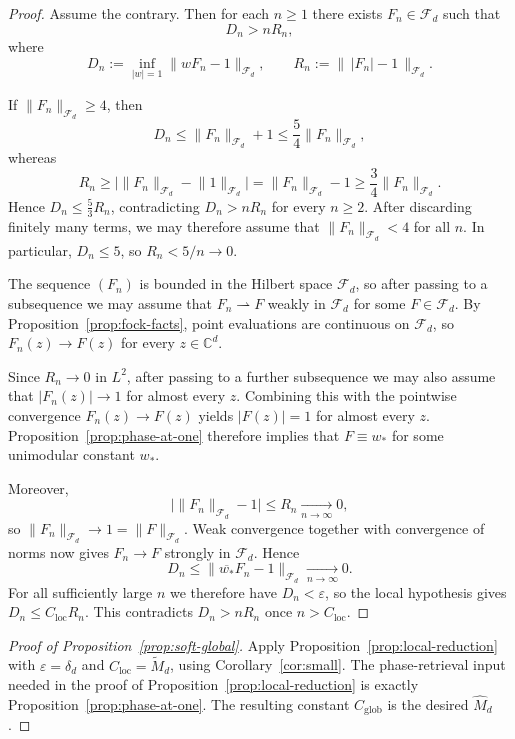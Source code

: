\documentclass[11pt]{amsart}
\theoremstyle{remark}
\newcommand{\C}{\mathbb{C}}
\newcommand{\abs}[1]{\lvert #1 \rvert}
\newcommand{\norm}[1]{\lVert #1 \rVert}
\newcommand{\Fd}{\mathcal{F}_d}
\begin{document}
\begin{proof}
Assume the contrary.  Then for each $n \ge 1$ there exists $F_n \in \Fd$
such that
\[
D_n > nR_n,
\]
where
\[
D_n := \inf_{\abs{w}=1}\norm{wF_n - 1}_{\Fd},
\qquad
R_n := \bigl\|\, \abs{F_n} - 1 \,\bigr\|_{\Fd}.
\]

If $\norm{F_n}_{\Fd} \ge 4$, then
\[
D_n \le \norm{F_n}_{\Fd} + 1 \le \frac54 \norm{F_n}_{\Fd},
\]
whereas
\[
R_n
\ge
\bigl|\norm{F_n}_{\Fd} - \norm{1}_{\Fd}\bigr|
=
\norm{F_n}_{\Fd} - 1
\ge
\frac34 \norm{F_n}_{\Fd}.
\]
Hence $D_n \le \frac53 R_n$, contradicting $D_n > nR_n$ for every
$n \ge 2$.  After discarding finitely many terms, we may therefore assume
that $\norm{F_n}_{\Fd} < 4$ for all $n$.  In particular, $D_n \le 5$, so
$R_n < 5/n \to 0$.

The sequence $(F_n)$ is bounded in the Hilbert space $\Fd$, so after
passing to a subsequence we may assume that $F_n \rightharpoonup F$ weakly
in $\Fd$ for some $F \in \Fd$.  By
Proposition~\ref{prop:fock-facts}, point evaluations are continuous on
$\Fd$, so $F_n(z) \to F(z)$ for every $z \in \C^d$.

Since $R_n \to 0$ in $L^2$, after passing to a further subsequence we may
also assume that $\abs{F_n(z)} \to 1$ for almost every $z$.  Combining this
with the pointwise convergence $F_n(z) \to F(z)$ yields
$\abs{F(z)} = 1$ for almost every $z$.  Proposition~\ref{prop:phase-at-one}
therefore implies that $F \equiv w_\ast$ for some unimodular constant
$w_\ast$.

Moreover,
\[
\bigl|\norm{F_n}_{\Fd} - 1\bigr|
\le
R_n
\xrightarrow[n\to\infty]{} 0,
\]
so $\norm{F_n}_{\Fd} \to 1 = \norm{F}_{\Fd}$.  Weak convergence together
with convergence of norms now gives $F_n \to F$ strongly in $\Fd$.  Hence
\[
D_n
\le
\norm{\overline{w_\ast}F_n - 1}_{\Fd}
\xrightarrow[n\to\infty]{} 0.
\]
For all sufficiently large $n$ we therefore have $D_n < \varepsilon$, so
the local hypothesis gives $D_n \le C_{\mathrm{loc}} R_n$.  This
contradicts $D_n > nR_n$ once $n > C_{\mathrm{loc}}$.
\end{proof}

\begin{proof}[Proof of Proposition~\ref{prop:soft-global}]
Apply Proposition~\ref{prop:local-reduction} with
$\varepsilon = \delta_d$ and $C_{\mathrm{loc}} = \widetilde M_d$,
using Corollary~\ref{cor:small}.  The phase-retrieval input needed in the
proof of Proposition~\ref{prop:local-reduction} is exactly
Proposition~\ref{prop:phase-at-one}.  The resulting constant
$C_{\mathrm{glob}}$ is the desired $\widehat M_d$.
\end{proof}
\end{document}
